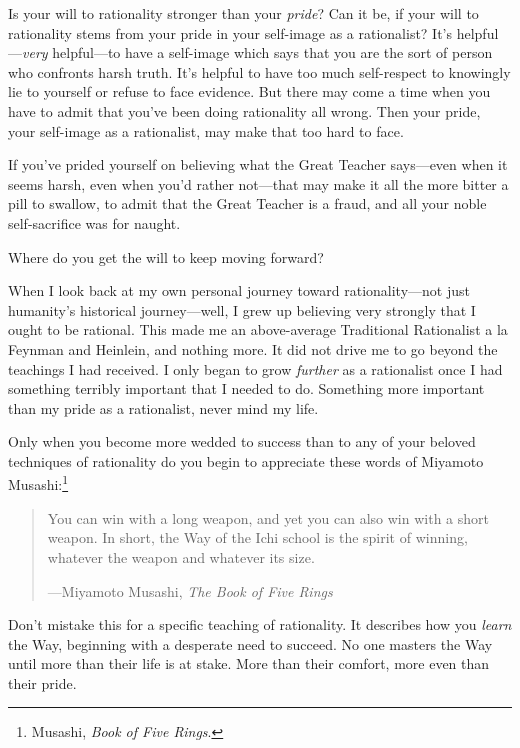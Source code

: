  Is your will to rationality stronger than your \textit{pride}? Can
it be, if your will to rationality stems from your pride in your
self-image as a rationalist? It's
helpful---\textit{very} helpful---to have a self-image which says that
you are the sort of person who confronts harsh truth.
It's helpful to have too much self-respect to knowingly
lie to yourself or refuse to face evidence. But there may come a time
when you have to admit that you've been doing
rationality all wrong. Then your pride, your self-image as a
rationalist, may make that too hard to face.


 If you've prided yourself on believing what the
Great Teacher says---even when it seems harsh, even when
you'd rather not---that may make it all the more bitter
a pill to swallow, to admit that the Great Teacher is a fraud, and all
your noble self-sacrifice was for naught.


 Where do you get the will to keep moving forward?


 When I look back at my own personal journey toward
rationality---not just humanity's historical
journey---well, I grew up believing very strongly that I ought to be
rational. This made me an above-average Traditional Rationalist a la
Feynman and Heinlein, and nothing more. It did not drive me to go
beyond the teachings I had received. I only began to grow
\textit{further} as a rationalist once I had something terribly
important that I needed to do. Something more important than my pride
as a rationalist, never mind my life.


 Only when you become more wedded to success than to any of your
beloved techniques of rationality do you begin to appreciate these
words of Miyamoto Musashi:\footnote{Musashi, \textit{Book of Five Rings}.}

\begin{quote}

 You can win with a long weapon, and yet you can also win with a
short weapon. In short, the Way of the Ichi school is the spirit of
winning, whatever the weapon and whatever its size.

{\raggedleft
 {}---Miyamoto Musashi, \textit{The Book of Five Rings}
 \par}
\end{quote}



 Don't mistake this for a specific teaching of
rationality. It describes how you \textit{learn} the Way, beginning
with a desperate need to succeed. No one masters the Way until more
than their life is at stake. More than their comfort, more even than
their pride.


